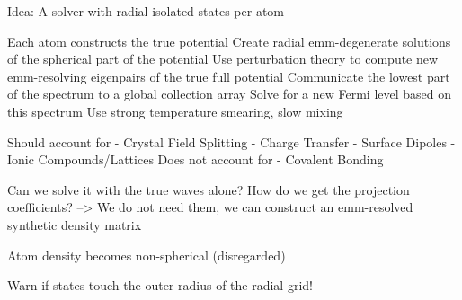 Idea:
  A solver with radial isolated states per atom
  
  Each atom constructs the true potential
  Create radial emm-degenerate solutions of the spherical part of the potential
  Use perturbation theory to compute new emm-resolving eigenpairs of the true full potential
  Communicate the lowest part of the spectrum to a global collection array
  Solve for a new Fermi level based on this spectrum
  Use strong temperature smearing, slow mixing
  
  Should account for
    - Crystal Field Splitting
    - Charge Transfer
    - Surface Dipoles
    - Ionic Compounds/Lattices
  Does not account for
    - Covalent Bonding

  Can we solve it with the true waves alone? How do we get the projection coefficients?
  --> We do not need them, we can construct an emm-resolved synthetic density matrix

  Atom density becomes non-spherical (disregarded)
  
  
  Warn if states touch the outer radius of the radial grid!
